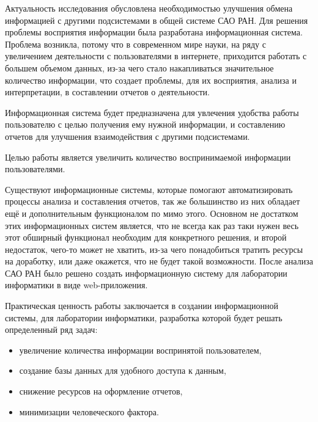 Актуальность исследования обусловлена необходимостью улучшения обмена информацией с другими подсистемами в общей системе САО РАН. Для решения проблемы восприятия информации была разработана информационная система. Проблема возникла, потому что в современном мире науки, на ряду с увеличением деятельности с пользователями в интернете, приходится работать с большем объемом данных, из-за чего стало накапливаться значительное количество информации, что создает проблемы, для их восприятия, анализа и интерпретации, в составлении отчетов о деятельности. 

Информационная система будет предназначена для увлечения удобства работы пользователю с целью получения ему нужной информации, и составлению отчетов для улучшения взаимодействия с другими подсистемами.

Целью работы является увеличить количество воспринимаемой информации пользователями. 

Существуют информационные системы, которые помогают автоматизировать процессы анализа и составления отчетов, так же большинство из них обладает ещё и дополнительным функционалом по мимо этого. Основном не достатком этих информационных систем является, что не всегда как раз таки нужен весь этот обширный функционал необходим для конкретного решения, и второй недостаток, чего-то может не хватить, из-за чего понадобиться тратить ресурсы на доработку, или даже окажется, что не будет такой возможности. После анализа САО РАН было решено создать информационную систему для лаборатории информатики в виде web-приложения.

Практическая ценность работы заключается в создании информационной системы, для лаборатории информатики, разработка которой будет решать определенный ряд задач:
\begin{itemize}
	\item увеличение количества информации воспринятой пользователем,
	\item создание базы данных для удобного доступа к данным,
	\item снижение ресурсов на оформление отчетов,
	\item минимизации человеческого фактора.
\end{itemize}



